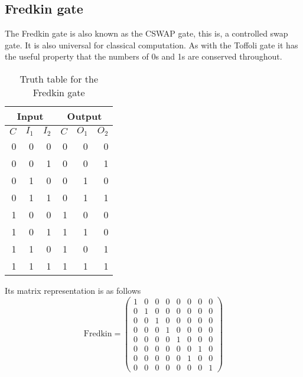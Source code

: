  \subsection{Fredkin gate}
 The Fredkin gate is also known as the CSWAP gate, this is, a controlled swap gate. It is also universal for classical computation. As with the Toffoli gate it has the useful property that the numbers of 0s and 1s are conserved throughout.
 \begin{table}[h!]
 \begin{center}
 \begin{tabular}{rrr|rrr}
 \multicolumn{ 3}{c|}{Input} & \multicolumn{ 3}{c}{Output} \\ \hline
 $C$ & $I_1$ & $I_2$ & $C$ & $O_1$ & $O_2$ \\ \hline
 0 & 0 & 0 & 0 & 0 & 0 \\ %
 0 & 0 & 1 & 0 & 0 & 1 \\ %
 0 & 1 & 0 & 0 & 1 & 0 \\ %
 0 & 1 & 1 & 0 & 1 & 1 \\ %
 1 & 0 & 0 & 1 & 0 & 0 \\ %
 1 & 0 & 1 & 1 & 1 & 0 \\ %
 1 & 1 & 0 & 1 & 0 & 1 \\ %
 1 & 1 & 1 & 1 & 1 & 1 \\ %
 \end{tabular}
 \end{center}
 \vspace{-15pt}\caption{Truth table for the Fredkin gate}
 \end{table}
 Its matrix representation is as follows
 \begin{equation}
   \text{Fredkin} = \left(\begin{array}{cccccccc}
   1 & 0 & 0 & 0 & 0 & 0 & 0 & 0 \\
   0 & 1 & 0 & 0 & 0 & 0 & 0 & 0 \\
   0 & 0 & 1 & 0 & 0 & 0 & 0 & 0 \\
   0 & 0 & 0 & 1 & 0 & 0 & 0 & 0 \\
   0 & 0 & 0 & 0 & 1 & 0 & 0 & 0 \\
   0 & 0 & 0 & 0 & 0 & 0 & 1 & 0 \\
   0 & 0 & 0 & 0 & 0 & 1 & 0 & 0 \\
   0 & 0 & 0 & 0 & 0 & 0 & 0 & 1
   \end{array}\right)
 \end{equation}

